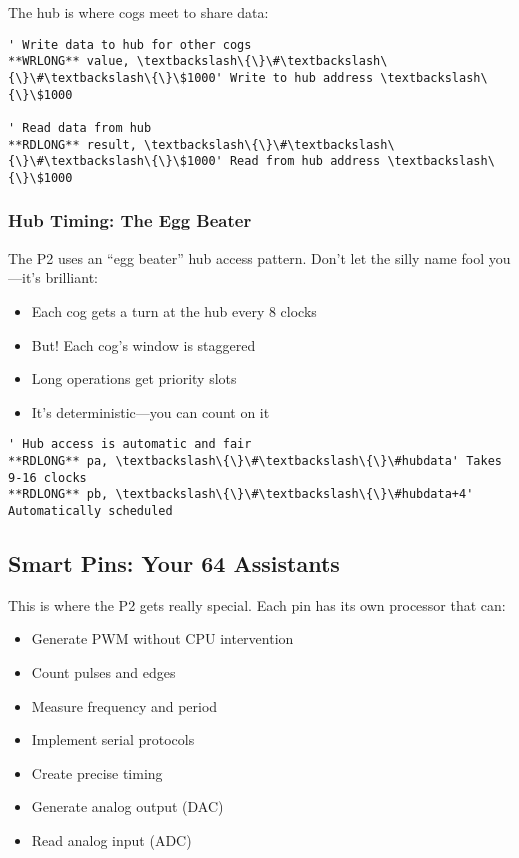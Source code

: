 \documentclass[11pt]{book}
\providecommand{\tightlist}{%
  \setlength{\itemsep}{0pt}\setlength{\parskip}{0pt}}
\begin{document}
The hub is where cogs meet to share data:

\begin{lstlisting}
' Write data to hub for other cogs
**WRLONG** value, \textbackslash\{\}\#\textbackslash\{\}\#\textbackslash\{\}\$1000' Write to hub address \textbackslash\{\}\$1000
        
' Read data from hub
**RDLONG** result, \textbackslash\{\}\#\textbackslash\{\}\#\textbackslash\{\}\$1000' Read from hub address \textbackslash\{\}\$1000
\end{lstlisting}

\hypertarget{hub-timing-the-egg-beater}{%
\subsubsection{Hub Timing: The Egg
Beater}\label{hub-timing-the-egg-beater}}

The P2 uses an ``egg beater'' hub access pattern. Don't let the silly
name fool you---it's brilliant:

\begin{itemize}
\tightlist
\item
  Each cog gets a turn at the hub every 8 clocks
\item
  But! Each cog's window is staggered
\item
  Long operations get priority slots
\item
  It's deterministic---you can count on it
\end{itemize}

\begin{lstlisting}
' Hub access is automatic and fair
**RDLONG** pa, \textbackslash\{\}\#\textbackslash\{\}\#hubdata' Takes 9-16 clocks
**RDLONG** pb, \textbackslash\{\}\#\textbackslash\{\}\#hubdata+4' Automatically scheduled
\end{lstlisting}

\hypertarget{smart-pins-your-64-assistants}{%
\subsection{Smart Pins: Your 64
Assistants}\label{smart-pins-your-64-assistants}}

This is where the P2 gets really special. Each pin has its own processor
that can:

\begin{itemize}
\tightlist
\item
  Generate PWM without CPU intervention
\item
  Count pulses and edges
\item
  Measure frequency and period
\item
  Implement serial protocols
\item
  Create precise timing
\item
  Generate analog output (DAC)
\item
  Read analog input (ADC)
\end{itemize}
\end{document}
